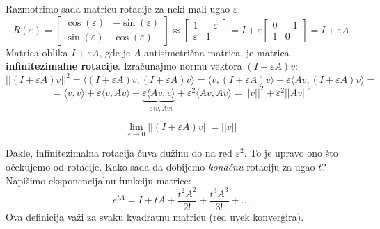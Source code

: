 \documentclass[a4paper,12pt,twoside]{report}
\numberwithin{algorithm}{section}
\begin{document}
    Razmotrimo sada matricu rotacije za neki
    mali ugao $\varepsilon$.
    \[
        R(\varepsilon) = \begin{bmatrix}
            \cos (\varepsilon) & -\sin (\varepsilon) \\
            \sin (\varepsilon) & \cos (\varepsilon)
        \end{bmatrix} \approx \begin{bmatrix}
            1 & -\varepsilon \\
            \varepsilon & 1
        \end{bmatrix} = I + \varepsilon \begin{bmatrix}
            0 & -1 \\
            1 & 0
        \end{bmatrix} = I + \varepsilon A
    \]
    Matrica oblika $I + \varepsilon A$, gde je $A$ antisimetrična matrica, je matrica \textbf{infinitezimalne rotacije}.
    Izračunajmo normu vektora $(I + \varepsilon A)v$\;:
    \[ ||(I + \varepsilon A)v||^2 = \langle (I + \varepsilon A)v, (I + \varepsilon A)v \rangle = 
    \langle v, (I + \varepsilon A)v \rangle + \varepsilon \langle  Av, (I + \varepsilon A)v \rangle = \]
    \[ = \langle v, v \rangle + \varepsilon \langle v, Av \rangle + \underbrace{\varepsilon \langle Av, v \rangle }_{-\varepsilon
     \langle v, Av \rangle} + \varepsilon^2 \langle Av, Av \rangle = ||v||^2 + \varepsilon^2||Av||^2\]

    \[ \lim_{\varepsilon \to 0} ||(I + \varepsilon A)v || = ||v||\]

    Dakle, infinitezimalna rotacija čuva dužinu do na red $\varepsilon^2$. To je upravo ono što očekujemo od rotacije. Kako sada 
    da dobijemo \textit{konačnu} rotaciju za ugao $t$? Napišimo eksponencijalnu funkciju matrice:
    \[ e^{tA} = I + tA + \frac{t^2A^2}{2!} + \frac{t^3A^3}{3!} + \dots \]
    Ova definicija važi za svaku kvadratnu matricu (red uvek konvergira).
\end{document}
